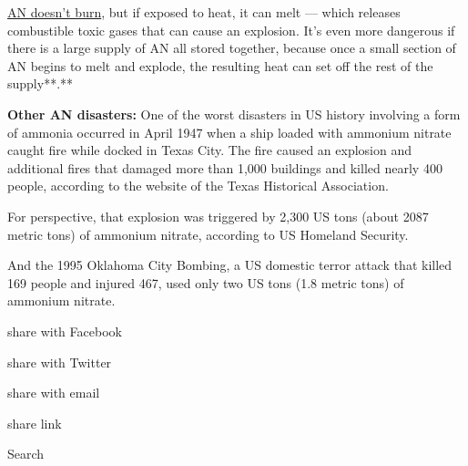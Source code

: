 \href{https://www.cnn.com/2020/08/05/middleeast/beirut-blast-explainer-intl-hnk/index.html}{AN
doesn't burn}, but if exposed to heat, it can melt --- which releases
combustible toxic gases that can cause an explosion. It's even more
dangerous if there is a large supply of AN all stored together, because
once a small section of AN begins to melt and explode, the resulting
heat can set off the rest of the supply**.**

\textbf{Other AN disasters:} One of the worst disasters in US history
involving a form of ammonia occurred in April 1947 when a ship loaded
with ammonium nitrate caught fire while docked in Texas City. The fire
caused an explosion and additional fires that damaged more than 1,000
buildings and killed nearly 400 people, according to the website of the
Texas Historical Association.

For perspective, that explosion was triggered by 2,300 US tons (about
2087 metric tons) of ammonium nitrate, according to US Homeland
Security.

And the 1995 Oklahoma City Bombing, a US domestic terror attack that
killed 169 people and injured 467, used only two US tons (1.8 metric
tons) of ammonium nitrate.

share with Facebook

share with Twitter

share with email

share link

Search

